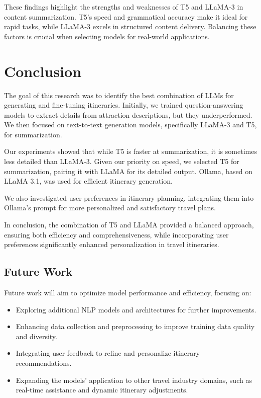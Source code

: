 \documentclass[conference]{IEEEtran}
\begin{document}
These findings highlight the strengths and weaknesses of T5 and LLaMA-3 in content summarization. T5's speed and grammatical accuracy make it ideal for rapid tasks, while LLaMA-3 excels in structured content delivery. Balancing these factors is crucial when selecting models for real-world applications.



\section{Conclusion}

The goal of this research was to identify the best combination of LLMs for generating and fine-tuning itineraries. Initially, we trained question-answering models to extract details from attraction descriptions, but they underperformed. We then focused on text-to-text generation models, specifically LLaMA-3 and T5, for summarization.

Our experiments showed that while T5 is faster at summarization, it is sometimes less detailed than LLaMA-3. Given our priority on speed, we selected T5 for summarization, pairing it with LLaMA for its detailed output. Ollama, based on LLaMA 3.1, was used for efficient itinerary generation.

We also investigated user preferences in itinerary planning, integrating them into Ollama's prompt for more personalized and satisfactory travel plans.

In conclusion, the combination of T5 and LLaMA provided a balanced approach, ensuring both efficiency and comprehensiveness, while incorporating user preferences significantly enhanced personalization in travel itineraries.


    \subsection{Future Work}

Future work will aim to optimize model performance and efficiency, focusing on:
\begin{itemize}
    \item Exploring additional NLP models and architectures for further improvements.
    \item Enhancing data collection and preprocessing to improve training data quality and diversity.
    \item Integrating user feedback to refine and personalize itinerary recommendations.
    \item Expanding the models' application to other travel industry domains, such as real-time assistance and dynamic itinerary adjustments.
\end{itemize}
\end{document}

